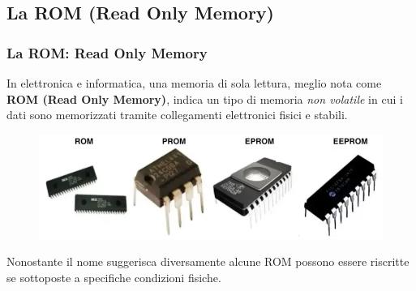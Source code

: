 \subsection[La ROM (Read Only Memory)]{La ROM (Read Only Memory)}
\begin{frame}
	\frametitle{La ROM: Read Only Memory}
	  
	\begin{block}{}
		In elettronica e informatica, una memoria di sola lettura, meglio nota come \textbf{ROM (Read Only Memory)}, indica un tipo di memoria \textit{non volatile} in cui i dati sono memorizzati tramite collegamenti elettronici fisici e stabili.
		
		\begin{figure}[!htbp] 
			\centering
			\includegraphics[width=0.80\linewidth]{images/5_memory/roms.png}
		\end{figure}
		
		Nonostante il nome suggerisca diversamente alcune ROM possono essere riscritte se sottoposte a specifiche condizioni fisiche.
		
		
	\end{block}
	
\end{frame}


